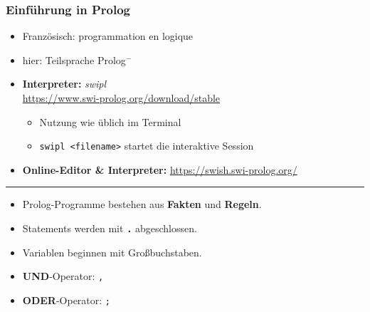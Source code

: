 \documentclass{beamer}
\renewcommand{\emph}[1]{\textbf{#1}}
\begin{document}
\begin{frame} \frametitle{Einführung in Prolog}
	\footnotesize
	\begin{itemize}
		\item Französisch: programmation en logique 
		\item hier: Teilsprache Prolog${}^-$
		\item \textbf{Interpreter:} \textit{swipl} \\ \url{https://www.swi-prolog.org/download/stable}
		\begin{itemize} \footnotesize
			\item Nutzung wie üblich im Terminal
			\item \texttt{swipl <filename>} startet die interaktive Session
		\end{itemize}
		\item \textbf{Online-Editor \& Interpreter:} \url{https://swish.swi-prolog.org/}
	\end{itemize}
	
	\bigskip \pause \hrule \medskip
	
	\begin{itemize}		
		\item Prolog-Programme bestehen aus \emph{Fakten} und \emph{Regeln}.
		\bigskip
		\item Statements werden mit \emph{\texttt{.}} abgeschlossen.
		\item Variablen beginnen mit Großbuchstaben.
		\bigskip
		\item \emph{UND}-Operator: \hspace{.25cm} \texttt{,}
		\item \emph{ODER}-Operator:\hspace{.2cm} \texttt{;}
	\end{itemize}
\end{frame}
\end{document}
